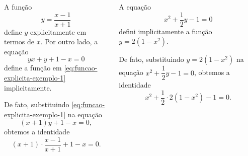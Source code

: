 \begin{frame}
    \vspace{-15pt}
    \begin{columns}\justifying
        \begin{example-highlight}
            A função
            \begin{equation}\label{eq:funcao-explicita-exemplo-1}
              y = \frac{x-1}{x+1}
            \end{equation}
            define $y$ explicitamente em termos de $x$. Por outro lado, a equação 
            \begin{equation*}\label{eq:funcao-implicita-exemplo-1}
              yx + y + 1 - x = 0
            \end{equation*}
            define a função em \eqref{eq:funcao-explicita-exemplo-1} implicitamente.
            
            De fato, substituindo \eqref{eq:funcao-explicita-exemplo-1} na equação $$(x + 1)y + 1 - x = 0,$$ obtemos a identidade $$(x + 1)\cdot \frac{x-1}{x+1} + 1 - x = 0.$$
        \end{example-highlight}
        \hfill
        \begin{example-highlight}
            A equação $$x^2+\dfrac{1}{2}y -1 = 0$$ defini implicitamente a função $y = 2(1-x^2)$.
            
            De fato, substituindo $y = 2(1-x^2)$ na equação $x^2+\dfrac{1}{2}y -1 = 0$, obtemos a identidade
            $$x^2+\dfrac{1}{2}\cdot 2(1-x^2) -1 = 0.$$
        \end{example-highlight}
    \end{columns}
\end{frame}

